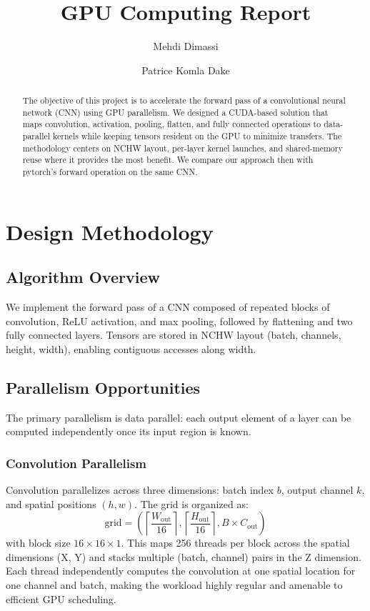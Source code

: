 \documentclass[11pt]{article}
\title{GPU Computing Report}
\author{Mehdi Dimassi \and Patrice Komla Dake}
\date{}
\begin{document}
\maketitle

\begin{abstract}
The objective of this project is to accelerate the forward pass of a convolutional neural network (CNN) using GPU parallelism. We designed a CUDA-based solution that maps convolution, activation, pooling, flatten, and fully connected operations to data-parallel kernels while keeping tensors resident on the GPU to minimize transfers. The methodology centers on NCHW layout, per-layer kernel launches, and shared-memory reuse where it provides the most benefit.
We compare our approach then with pytorch's forward operation on the same CNN.
\end{abstract}

\section{Design Methodology}
\subsection{Algorithm Overview}
We implement the forward pass of a CNN composed of repeated blocks of convolution, ReLU activation, and max pooling, followed by flattening and two fully connected layers. Tensors are stored in NCHW layout (batch, channels, height, width), enabling contiguous accesses along width.

\subsection{Parallelism Opportunities}
The primary parallelism is data parallel: each output element of a layer can be computed independently once its input region is known.

\subsubsection{Convolution Parallelism}
Convolution parallelizes across three dimensions: batch index $b$, output channel $k$, and spatial positions $(h, w)$. The grid is organized as:
\begin{equation}
\text{grid} = \left( \left\lceil \frac{W_{\text{out}}}{16} \right\rceil, \left\lceil \frac{H_{\text{out}}}{16} \right\rceil, B \times C_{\text{out}} \right)
\end{equation}
with block size $16 \times 16 \times 1$. This maps 256 threads per block across the spatial dimensions (X, Y) and stacks multiple (batch, channel) pairs in the Z dimension. Each thread independently computes the convolution at one spatial location for one channel and batch, making the workload highly regular and amenable to efficient GPU scheduling.
\end{document}
